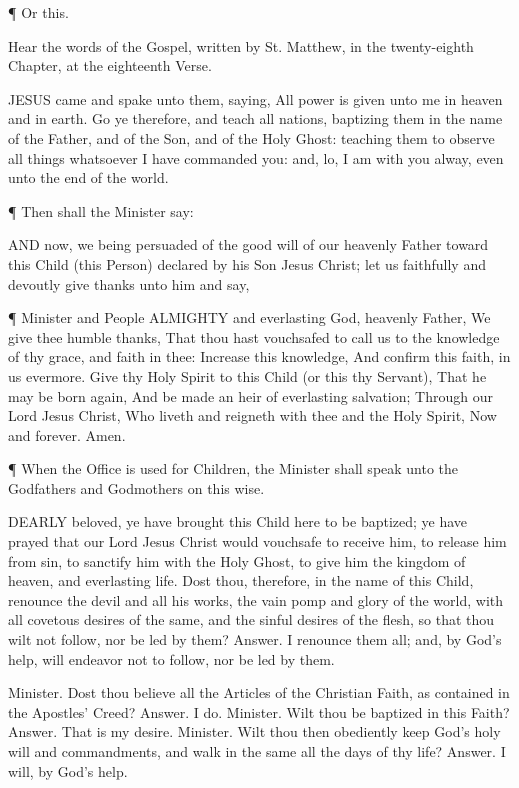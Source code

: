 ¶ Or this.

    Hear the words of the Gospel, written by St. Matthew, in the twenty-eighth Chapter, at the eighteenth Verse.

JESUS came and spake unto them, saying, All power is given unto me in heaven and in earth. Go ye therefore, and teach all nations, baptizing them in the name of the Father, and of the Son, and of the Holy Ghost: teaching them to observe all things whatsoever I have commanded you: and, lo, I am with you alway, even unto the end of the world.
 

 
¶ Then shall the Minister say:

AND now, we being persuaded of the good will of our heavenly Father toward this Child (this Person) declared by his Son Jesus Christ; let us faithfully and devoutly give thanks unto him and say,

¶ Minister and People
ALMIGHTY and everlasting God, heavenly Father, We give thee humble thanks, That thou hast vouchsafed to call us to the knowledge of thy grace, and faith in thee: Increase this knowledge, And confirm this faith, in us evermore. Give thy Holy Spirit to this Child (or this thy Servant), That he may be born again, And be made an heir of everlasting salvation; Through our Lord Jesus Christ, Who liveth and reigneth with thee and the Holy Spirit, Now and forever. Amen.
 
¶ When the Office is used for Children, the Minister shall speak unto the Godfathers and Godmothers on this wise.

DEARLY beloved, ye have brought this Child here to be baptized; ye have prayed that our Lord Jesus Christ would vouchsafe to receive him, to release him from sin, to sanctify him with the Holy Ghost, to give him the kingdom of heaven, and everlasting life.
    Dost thou, therefore, in the name of this Child, renounce the devil and all his works, the vain pomp and glory of the world, with all covetous desires of the same, and the sinful desires of the flesh, so that thou wilt not follow, nor be led by them?
    Answer. I renounce them all; and, by God’s help, will endeavor not to follow, nor be led by them.

    Minister. Dost thou believe all the Articles of the Christian Faith, as contained in the Apostles’ Creed?
    Answer. I do.
    Minister. Wilt thou be baptized in this Faith?
    Answer. That is my desire.
    Minister. Wilt thou then obediently keep God’s holy will and commandments, and walk in the same all the days of thy life?
    Answer. I will, by God’s help.

